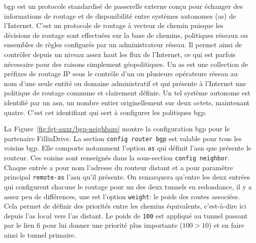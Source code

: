 \documentclass[12pt, oneside, a4paper, titlepage]{report}
\begin{document}
\acrfull{bgp} est un protocole standardisé de passerelle externe conçu pour
échanger des informations de routage et de disponibilité entre systèmes
autonomes (\gls{as}) de l'Internet. C'est un protocole de routage à vecteur de
chemin puisque les décisions de routage sont effectuées sur la base de chemins,
politiques réseaux ou ensembles de règles configurés par un administrateur
réseau. Il permet ainsi de contrôler depuis un niveau assez haut les flux de
l'Internet, ce qui est parfois nécessaire pour des raisons simplement
géopolitiques. Un \gls{as} est une collection de préfixes de routage IP sous le
contrôle d'un ou plusieurs opérateurs réseau au nom d'une seule entité ou
domaine administratif et qui présente à l'Internet une politique de routage
commune et clairement définie. Un tel système autonome est identifié par un
\gls{asn}, un nombre entier originellement sur deux octets, maintenant quatre.
C'est cet identifiant qui sert à configurer les politiques \gls{bgp}.

La Figure~\ref{fig:fgt-auxr/bgp-neighbors} montre la configuration \gls{bgp}
pour le partenaire FillinDrive. La section \texttt{config router bgp} est
valable pour tous les voisins \gls{bgp}. Elle comporte notamment l'option
\texttt{as} qui définit l'\gls{asn} que présente le routeur. Ces voisins sont
renseignés dans la sous-section \texttt{config neighbor}. Chaque entrée a pour
nom l'adresse du routeur distant et a pour paramètre principal
\texttt{remote-as} l'\gls{asn} qu'il présente. On remarquera qu'entre les deux
entrées qui configurent chacune le routage pour un des deux tunnels en
redondance, il y a assez peu de différences, une est l'option \texttt{weight}:
le poids des routes associées. Cela permet de définir des priorités entre les
chemins équivalents, c'est-à-dire ici depuis l'\gls{as} local vers l'\gls{as}
distant. Le poids de \texttt{100} est appliqué au tunnel passant par le lien
\gls{fi} pour lui donner une priorité plus importante ($100 > 10$) et en faire
ainsi le tunnel primaire.
\end{document}
